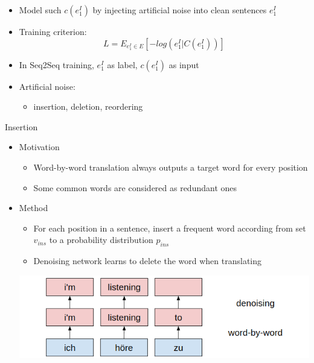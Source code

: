 \documentclass[11pt, a4paper, landscape]{article}
\begin{document}
\NewPage
{}	
\vfill
\begin{itemize}
	\item Model such  $c(e_1^I)$ by injecting artificial noise into clean sentences $e_1^I$
	\item Training criterion:
	\[ L = E_{e_1^I \in E}[-log(e_1^I|C(e_1^I))]\]
	\item In Seq2Seq training, $e_1^I$ as label, $c(e_1^I)$  as input 
	\item Artificial noise:
	\begin{itemize}
		\item insertion, deletion, reordering
	\end{itemize} 
	
\end{itemize}
\vfill

\NewPage
{}	
\vfill	
Insertion
\begin{itemize}
	\item Motivation
	\begin{itemize}
		\item Word-by-word translation always outputs a target word for every position
		\item Some common words are considered as redundant ones
	\end{itemize}
	\item Method
	\begin{itemize}
		\item For each position in a sentence, insert a frequent word according from set ${v_{ins}}$ to a probability distribution ${p_{ins}}$
		\item Denoising network learns to delete the word when translating
	\end{itemize}
	\begin{center}
		\vspace{0.5em}
		\hspace{-1cm}\includegraphics[width=0.8\linewidth]{insertion}
	\end{center}\vspace{0.5em}	
\end{itemize}
\end{document}
